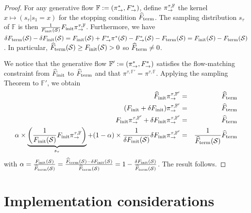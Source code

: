 \documentclass{article}
\theoremstyle{plain}
\theoremstyle{definition}
\theoremstyle{remark}
\theoremstyle{fact}
\begin{document}
\begin{proof}
    For any generative flow $\mathbb F:=(\pi_{\rightarrow}^*,F_{\rightarrow}^*)$, define $\pi_{\rightarrow}^{\tau,\mathbb F}$ the kernel $x\mapsto (s_{\tau}|s_1=x)$  for the stopping condition $\widehat{F}_{\mathrm{term}}$. The sampling distribution $s_\tau$ of $\mathbb F$ is then $\frac{1}{F_{\mathrm{init}}(\mathcal S)}F_{\mathrm{init}} \pi_{\rightarrow}^{\tau,\mathbb F}$. 
    Furthermore, we have $\delta F_{\mathrm{term}}(\mathcal S)-\delta F_{\mathrm{init}}(\mathcal S)=F_{\mathrm{init}}(\mathcal S)+F_{\rightarrow}^* \pi^*(\mathcal S)-F_{\rightarrow}^*(\mathcal S)-F_{\mathrm{term}}(\mathcal S)=F_{\mathrm{init}}(\mathcal S)-F_{\mathrm{term}}(\mathcal S)$.
    In particular, $\widehat{F}_{\mathrm{term}}(\mathcal S)\geq F_{\mathrm{init}}(\mathcal S)> 0$ so $\widehat{F}_{\mathrm{term}} \neq 0$.
    
    We notice that the generative flow $\mathbb F':=(\pi_{\rightarrow}^*,F_{\rightarrow}^*)$ satisfies the flow-matching constraint from $\widehat {F}_{\mathrm{init}}$ to $\widehat{F}_{\mathrm{term}}$  and that $\pi^{\tau,\mathbb F'} = \pi^{\tau,\mathbb F}$.  
    Applying the sampling Theorem to $\mathbb F'$, we obtain 
    \begin{eqnarray}
        \widehat {F}_{\mathrm{init}}\pi_{\rightarrow}^{\tau,\mathbb F'} &=& \widehat{F}_{\mathrm{term}}\\
        (F_{\mathrm{init}}+\delta F_{\mathrm{init}})\pi_{\rightarrow}^{\tau,\mathbb F'} &=& \widehat{F}_{\mathrm{term}}\\
        F_{\mathrm{init}}\pi_{\rightarrow}^{\tau,\mathbb F'}+\delta F_{\mathrm{init}}\pi_{\rightarrow}^{\tau,\mathbb F'} &=& \widehat{F}_{\mathrm{term}} \\
         \alpha\times \underbrace{\left(\frac{1}{F_{\mathrm{init}}(\mathcal S)}F_{\mathrm{init}} \pi_{\rightarrow}^{\tau,\mathbb F}\right)}_{s_\tau}+(1-\alpha) \times  \frac{1}{\delta F_{\mathrm{init}}(\mathcal S)}\delta F_{\mathrm{init}}\pi_{\rightarrow}^{\tau,\mathbb F'} &=& \frac{1}{\widehat{F}_{\mathrm{term}}(\mathcal S)}\widehat{F}_{\mathrm{term}}
    \end{eqnarray}
    with $\alpha = \frac{F_{\mathrm{init}}(\mathcal S)}{\widehat{F}_{\mathrm{term}}(\mathcal S)}=\frac{\widehat{F}_{\mathrm{term}}(\mathcal S)-\delta F_{\mathrm{init}}(\mathcal S)}{\widehat{F}_{\mathrm{term}}(\mathcal S)}=1-\frac{\delta F_{\mathrm{init}}(\mathcal S)}{\widehat{F}_{\mathrm{term}}(\mathcal S)}$. 
    The result follows.
\end{proof}















\section{Implementation considerations}
\end{document}
